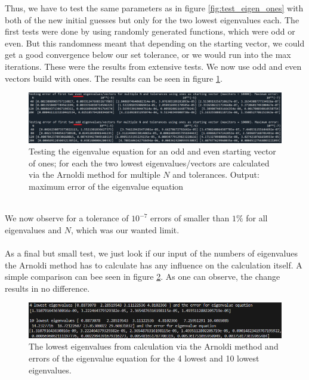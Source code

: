 \documentclass[11pt, letterpaper, onecolumn]{article}
\begin{document}
	Thus, we have to test the same parameters as in figure \ref{fig:test_eigen_ones} with both of the new initial guesses but only for the two lowest eigenvalues each. The first tests were done by using randomly generated functions, which were odd or even. But this randomness meant that depending on the starting vector, we could get a good convergence below our set tolerance, or we would run into the max iterations. These were the results from extensive tests.  We now use odd and even vectors build with ones. The results can be seen in figure \ref{fig:test_eigen_even-odd}.
	\begin{figure} [h] 
	\begin{center}	
	\includegraphics[width=19cm]{"test_eigen_even-odd.png"}
	\caption{Testing the eigenvalue equation for an odd and even starting vector of ones; for each the two lowest eigenvalues/vectors are calculated via the Arnoldi method for multiple $N$ and tolerances. Output: maximum error of the eigenvalue equation} \label{fig:test_eigen_even-odd}
	\end{center}
	\end{figure}
	\\
	We now observe for a tolerance of $10^{-7}$ errors of smaller than $1\%$ for all eigenvalues and $N$, which was our wanted limit.
	\\
	\\
	As a final but small test, we just look if our input of the numbers of eigenvalues the Arnoldi method has to calculate has any influence on the calculation itself. A simple comparison can bee seen in figure \ref{fig:test_eigen_number}. As one can observe, the change results in no difference.
	\begin{figure} [h] 
	\begin{center}	
	\includegraphics[width=19cm]{"test_eigen_numbers.png"}
	\caption{The lowest eigenvalues from calculation via the Arnoldi method and errors of the eigenvalue equation for the 4 lowest and 10 lowest eigenvalues.} \label{fig:test_eigen_number}
	\end{center}
	\end{figure}
\end{document}
